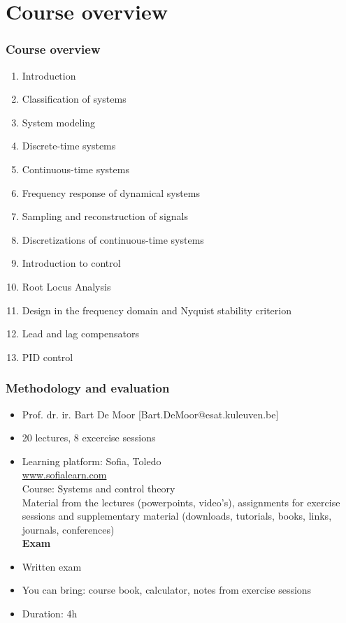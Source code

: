 \section{Course overview} 

\begin{frame}
	\frametitle{Course overview}
	\begin{enumerate}
		\item Introduction
		\item Classification of systems
		\item System modeling
		\item Discrete-time systems
		\item Continuous-time systems
		\item Frequency response of dynamical systems
		\item Sampling and reconstruction of signals
		\item Discretizations of continuous-time systems
		\item Introduction to control
		\item Root Locus Analysis
		\item Design in the frequency domain and Nyquist stability criterion
		\item Lead and lag compensators
		\item PID control
	\end{enumerate}
\end{frame}

\begin{frame}
	\frametitle{Methodology and evaluation}
	\begin{itemize}
		\item Prof. dr. ir. Bart De Moor ‎[Bart.DeMoor@esat.kuleuven.be]‎
		\item 20 lectures, 8 excercise sessions\\
		\item Learning platform: Sofia, Toledo\\
		\url{www.sofialearn.com}\\
		Course: Systems and control theory\\
		Material from the lectures (powerpoints, video's), assignments for exercise sessions and supplementary material (downloads, tutorials, books, links, journals, conferences)\\
		\bigskip
		\textbf{Exam}
		\item Written exam
		\item You can bring: course book, calculator, notes from exercise sessions
		\item Duration: 4h
	\end{itemize}
\end{frame}

